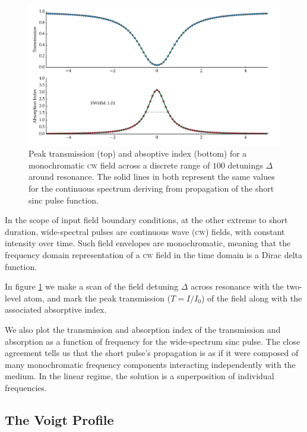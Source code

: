     \begin{figure}[]
    \includegraphics[width=\linewidth]{figs/02_propagation/two_mb_solve_scan_a00_fig1.pdf}
    \caption{
    Peak transmission (top) and absoptive index (bottom) for a monochromatic
    \textsc{cw} field across a discrete range of $100$ detunings $\Delta$ around
    resonance. The solid lines in both represent the same values for the
    continuous spectrum deriving from propagation of the short sinc pulse
    function.
    }
    \label{fig:linear_cw_scan_trans}
    \end{figure}

    In the scope of input field boundary conditions, at the other extreme to
    short duration, wide-spectral pulses are continuous wave (\textsc{cw})
    fields, with constant intensity over time. Such field envelopes are
    monochromatic, meaning that the frequency domain representation of a
    \textsc{cw} field in the time domain is a Dirac delta function.

    In figure \ref{fig:linear_cw_scan_trans} we make a scan of the field
    detuning $\Delta$ across resonance with the two-level atom, and mark the
    peak transmission ($T = I/I_0$) of the field along with the associated
    absorptive index.

    We also plot the transmission and absorption index of the transmission and
    absorption as a function of frequency for the wide-spectrum sinc pulse. The
    close agreement tells us that the short pulse's propagation is as if it were
    composed of many monochromatic frequency components interacting
    independently with the medium. In the linear regime, the solution is a
    superposition of individual frequencies.\cite{boyd2008nonlinear}

  \subsection{The Voigt Profile} %

